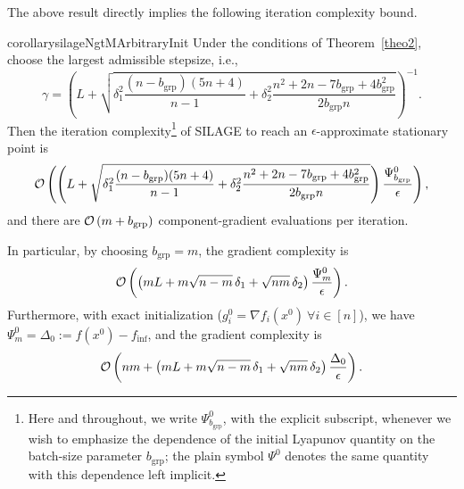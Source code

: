 \documentclass{article}
\newcommand{\cO}{{\cal O}}
\newcommand{\finf}{f_\mathrm{inf}}
\newcommand{\eqdef}{:=}
\newcommand{\rb}[1]{\left(#1\right)}
\theoremstyle{plain}
\newcommand{\algno}{{\sf\scalefont{0.88}\color{mydarkgreen}SILAGE}\xspace}
\begin{document}
The above result directly implies the following iteration complexity bound.
\begin{restatable}[Complexity, $n>m$]{corollary}{silageNgtMArbitraryInit}
\label{cor:silage_ngt_m_arbitrary_init}
Under the conditions of Theorem~\ref{theo2}, choose the largest admissible stepsize, i.e., 
\[\gamma=\rb{L+\sqrt{\delta_1^2\frac{(n-b_{\mathrm{grp}})(5n+4)}{n-1}+\delta_2^2\frac{n^2+2n-7b_{\mathrm{grp}}+4b_{\mathrm{grp}}^2}{2b_{\mathrm{grp}}n}}}^{-1}.\]
Then the iteration complexity\footnote{Here and throughout, we write $\Psi_{b_{\mathrm{grp}}}^0$, with the explicit subscript, whenever we wish to emphasize the dependence of the initial Lyapunov quantity on the batch-size parameter $b_{\mathrm{grp}}$; the plain symbol $\Psi^0$ denotes the same quantity with this dependence left implicit.} of \algno to reach an $\epsilon$-approximate stationary point is
\begin{equation}\label{eq:09709fy09gf}\cO\rb{\rb{L+\sqrt{\delta_1^2\frac{(n-b_{\mathrm{grp}})(5n+4)}{n-1}+\delta_2^2\frac{n^2+2n-7b_{\mathrm{grp}}+4b_{\mathrm{grp}}^2}{2b_{\mathrm{grp}}n}}}\frac{\Psi_{b_{\mathrm{grp}}}^0}{\epsilon}},\end{equation}
and there are $\cO\rb{m+b_{\mathrm{grp}}}$ component-gradient evaluations per iteration.

In particular, by choosing $b_{\mathrm{grp}}=m$, the gradient complexity is \[\cO\rb{\rb{mL+m\sqrt{n-m}\,\delta_1+\sqrt{nm}\,\delta_2}\frac{\Psi_m^0}{\epsilon}}.\]
Furthermore, with
exact initialization ($g_i^0 = \nabla f_i(x^0)\ \forall i \in [n]$), we have $\Psi_m^0 = \Delta_0 \eqdef f(x^0) - \finf$, and the gradient complexity is
\[\cO\rb{nm + \rb{mL+m\sqrt{n-m}\,\delta_1+\sqrt{nm}\,\delta_2}\frac{\Delta_0}{\epsilon}}.\]

\end{restatable}
\end{document}
